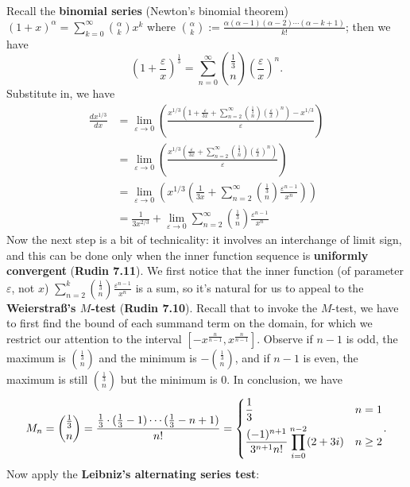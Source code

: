 \documentclass[10pt]{article}
\begin{document}
\begin{enumerate}[label=\alph*.]
Recall the \textbf{binomial series} (Newton's binomial theorem) $(1+x)^{\alpha}=\sum_{k=0}^{\infty}\binom{\alpha}{k} x^{k}$ where $\binom{\alpha}{k} :=\frac{\alpha(\alpha-1)(\alpha-2) \cdots(\alpha-k+1)}{k !}$; then we have
$$
\left(1+\frac{\varepsilon}{x}\right)^\frac{1}{3}=\sum_{n=0}^{\infty}\binom{\frac{1}{3}}{n} \left(\frac{\varepsilon}{x}\right)^{n}.
$$
Substitute in, we have
$$\begin{aligned}
\frac{d x^{1 / 3}}{d x}&=\lim _{\varepsilon \rightarrow 0}\left(\frac{x^{1 / 3}\left(1+\frac{\varepsilon}{3 x}+\sum_{n=2}^{\infty}\binom{\frac{1}{3}}{n} \left(\frac{\varepsilon}{x}\right)^{n}\right)-x^{1 / 3}}{\varepsilon}\right) \\
&=\lim _{\varepsilon \rightarrow 0}\left(\frac{x^{1 / 3}\left(\frac{\varepsilon}{3 x}+\sum_{n=2}^{\infty}\binom{\frac{1}{3}}{n} \left(\frac{\varepsilon}{x}\right)^{n}\right)}{\varepsilon}\right) \\
&=\lim _{\varepsilon \rightarrow 0}\left(x^{1 / 3}\left(\frac{1}{3 x}+\sum_{n=2}^{\infty}\binom{\frac{1}{3}}{n} \frac{\varepsilon^{n-1}}{x^n}\right)\right) \\
&=\frac{1}{3 x^{2 / 3}}+\lim_{\varepsilon\to0}\sum_{n=2}^{\infty}\binom{\frac{1}{3}}{n} \frac{\varepsilon^{n-1}}{x^n}
\end{aligned}$$
Now the next step is a bit of technicality: it involves an interchange of limit sign, and this can be done only when the inner function sequence is \textbf{uniformly convergent} (\textbf{Rudin 7.11}). We first notice that the inner function (of parameter $\varepsilon$, not $x$) $\sum_{n=2}^{k}\binom{\frac{1}{3}}{n} \frac{\varepsilon^{n-1}}{x^n}$ is a sum, so it's natural for us to appeal to the \textbf{Weierstra{\ss}'s $M$-test} (\textbf{Rudin 7.10}). Recall that to invoke the $M$-test, we have to first find the bound of each summand term on the domain, for which we restrict our attention to the interval $[-x^\frac{n}{n-1},x^\frac{n}{n-1}]$. Observe if $n-1$ is odd, the maximum is $\binom{\frac{1}{3}}{n}$ and the minimum is $-\binom{\frac{1}{3}}{n}$, and if $n-1$ is even, the maximum is still $\binom{\frac{1}{3}}{n}$ but the minimum is $0$. In conclusion, we have $$M_n=\binom{\frac{1}{3}}{n}=\frac{\frac{1}{3}\cdot(\frac{1}{3}-1)\cdots(\frac{1}{3}-n+1)}{n!}=\begin{aligned}\begin{dcases}\frac{1}{3}&n=1\\\frac{(-1)^{n+1}}{3^{n+1}n!}\prod_{i=0}^{n-2}(2+3i)&n\geq2\end{dcases}\end{aligned}.$$ Now apply the \textbf{Leibniz's alternating series test}:

\end{enumerate}
\end{document}
